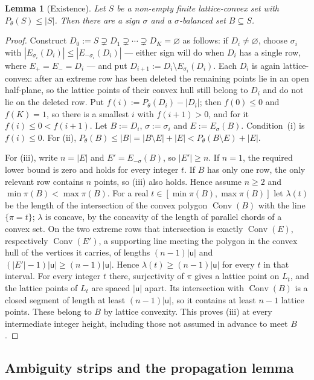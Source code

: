 \documentclass[11pt,reqno]{amsart}
\theoremstyle{plain}
\newtheorem{lem}[thm]{Lemma}
\theoremstyle{definition}
\theoremstyle{remark}
\theoremstyle{plain}
\theoremstyle{remark}
\theoremstyle{definition}
\numberwithin{equation}{section}
\DeclareMathOperator{\Conv}{Conv}
\newcommand{\su}{\mathsf{u}}
\begin{document}
\begin{lem}[Existence]\label{lem:balanced}
Let $S$ be a non-empty finite lattice-convex set with $P_\theta(S)\le|S|$.  Then
there are a sign $\sigma$ and a $\sigma$-balanced set $B\subseteq S$.
\end{lem}

\begin{proof}
Construct $D_0:=S\supsetneq D_1\supsetneq\cdots\supsetneq D_K=\varnothing$ as
follows: if $D_i\ne\varnothing$, choose $\sigma_i$ with
$|E_{\sigma_i}(D_i)|\le|E_{-\sigma_i}(D_i)|$ — either sign will do when $D_i$
has a single row, where $E_+=E_-=D_i$ — and put
$D_{i+1}:=D_i\setminus E_{\sigma_i}(D_i)$.  Each $D_i$ is again lattice-convex:
after an extreme row has been deleted the remaining points lie in an open
half-plane, so the lattice points of their convex hull still belong to $D_i$ and
do not lie on the deleted row.  Put $f(i):=P_\theta(D_i)-|D_i|$; then $f(0)\le0$
and $f(K)=1$, so there is a smallest $i$ with $f(i+1)>0$, and for it
$f(i)\le0<f(i+1)$.  Let $B:=D_i$, $\sigma:=\sigma_i$ and $E:=E_\sigma(B)$.
Condition~(i) is $f(i)\le0$.  For (ii),
$P_\theta(B)\le|B|=|B\setminus E|+|E|<P_\theta(B\setminus E)+|E|$.

For (iii), write $n=|E|$ and $E'=E_{-\sigma}(B)$, so $|E'|\ge n$.
If $n=1$, the required lower bound is zero and holds for every integer $t$.
If $B$ has only one row, the only relevant row contains $n$ points, so (iii)
also holds.  Hence assume $n\ge2$ and $\min\pi(B)<\max\pi(B)$.
For a real
$t\in[\min\pi(B),\max\pi(B)]$ let $\lambda(t)$ be the length of the intersection
of the convex polygon $\Conv(B)$ with the line $\{\pi=t\}$; $\lambda$ is concave,
by the concavity of the length of parallel chords of a convex set.  On the two
extreme rows that intersection is exactly $\Conv(E)$, respectively $\Conv(E')$,
a supporting line meeting the polygon in the convex hull of the vertices it
carries, of lengths $(n-1)|\su|$ and $(|E'|-1)|\su|\ge(n-1)|\su|$.  Hence
$\lambda(t)\ge(n-1)|\su|$ for every $t$ in that interval.  For every integer
$t$ there, surjectivity of $\pi$ gives a lattice point on $L_t$, and the lattice
points of $L_t$ are spaced $|\su|$ apart.  Its intersection with $\Conv(B)$ is
a closed segment of length at least $(n-1)|\su|$, so it contains at least
$n-1$ lattice points.  These belong to $B$ by lattice convexity.  This proves
(iii) at every intermediate integer height, including those not assumed in
advance to meet $B$.
\end{proof}

\subsection{Ambiguity strips and the propagation lemma}\label{app:szab-prop}
\end{document}
